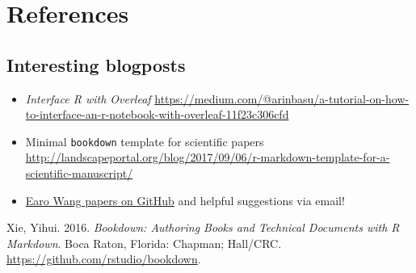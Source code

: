 \documentclass[12pt,]{article}
\begin{document}
\newpage

\section*{References}\label{references}

\subsection{Interesting blogposts}\label{interesting-blogposts}

\begin{itemize}
\item
  \emph{Interface R with Overleaf}
  \url{https://medium.com/@arinbasu/a-tutorial-on-how-to-interface-an-r-notebook-with-overleaf-11f23c306cfd}
\item
  Minimal \texttt{bookdown} template for scientific papers
  \url{http://landscapeportal.org/blog/2017/09/06/r-markdown-template-for-a-scientific-manuscript/}
\item
  \href{https://github.com/earowang/paper-calendar-vis}{Earo Wang papers
  on GitHub} and helpful suggestions via email!
\end{itemize}

\hypertarget{refs}{}
\hypertarget{ref-bookdown}{}
Xie, Yihui. 2016. \emph{Bookdown: Authoring Books and Technical
Documents with R Markdown}. Boca Raton, Florida: Chapman; Hall/CRC.
\url{https://github.com/rstudio/bookdown}.
\end{document}
